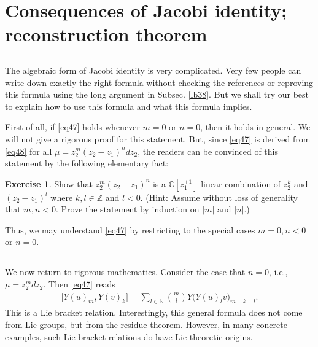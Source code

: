 \documentclass[11pt,b5paper,notitlepage]{article}
\theoremstyle{definition}
\newtheorem{exe}[df]{Exercise}
\theoremstyle{plain}
\newcommand{\Cbb}{\mathbb C}
\newcommand{\Nbb}{\mathbb N}
\newcommand{\Zbb}{\mathbb Z}
\numberwithin{equation}{section}
\begin{document}
\section{Consequences of Jacobi identity; reconstruction theorem}



\subsection{}
The algebraic form of Jacobi identity is very complicated. Very few people can write down exactly the right formula without checking the references or reproving this formula using the long argument in Subsec. \ref{lb38}. But we shall try our best to explain how to use this formula and what this formula implies.


First of all, if \eqref{eq47} holds whenever $m=0$ or $n=0$, then it holds in general. We will not give a rigorous proof for this statement. But, since \eqref{eq47} is derived from \eqref{eq48} for all $\mu=z_2^m(z_2-z_1)^ndz_2$, the readers can be convinced of this statement by the following elementary fact:

\begin{exe}
Show that $z_2^m(z_2-z_1)^n$ is a $\Cbb[z_1^{\pm1}]$-linear combination of $z_2^k$ and $(z_2-z_1)^l$ where $k,l\in\Zbb$ and $l<0$. (Hint: Assume without loss of generality that $m,n<0$. Prove the statement by induction on $|m|$ and $|n|$.)
\end{exe}

Thus, we may understand \eqref{eq47} by restricting to the special cases $m=0,n<0$ or $n=0$. 
\subsection{}



We now return to rigorous mathematics. Consider  the case that $n=0$, i.e., $\mu=z_2^mdz_2$. Then \eqref{eq47} reads
\begin{align}
\big[Y(u)_m,Y(v)_k\big]=\sum_{l\in\Nbb}{m\choose l}Y\big(Y(u)_lv\big)_{m+k-l}.	\label{eq49}
\end{align}
This is a Lie bracket relation. Interestingly, this general formula does not come from Lie groups, but from the residue theorem. However, in many concrete examples, such Lie bracket relations do have Lie-theoretic origins. 
\end{document}
